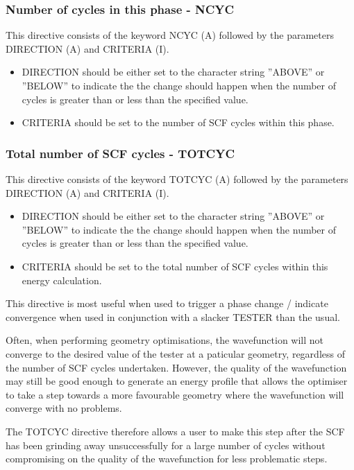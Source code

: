 \documentclass[11pt,fleqn]{article}
\begin{document}
\subsubsection[Number of cycles in this phase - NCYC]{Number of cycles in this phase - NCYC}
This directive consists of the keyword NCYC (A) followed
by the parameters DIRECTION (A) and CRITERIA (I).

\begin{itemize}
\item DIRECTION should be either set to the character string ''ABOVE'' or
  ''BELOW'' to indicate the the change should happen when the number
  of cycles is greater than or less than the specified value.
\item CRITERIA should be set to the number of SCF cycles within this phase.
\end{itemize}

\subsubsection[Total number of SCF cycles - TOTCYC]{Total number of SCF cycles - TOTCYC}
This directive consists of the keyword TOTCYC (A) followed
by the parameters DIRECTION (A) and CRITERIA (I).

\begin{itemize}
\item DIRECTION should be either set to the character string ''ABOVE'' or
  ''BELOW'' to indicate the the change should happen when the number
  of cycles is greater than or less than the specified value.
\item CRITERIA should be set to the total number of SCF cycles within
  this energy calculation.
\end{itemize}

This directive is most useful when used to trigger a phase change /
indicate convergence when used in conjunction with a slacker TESTER
than the usual.

Often, when performing geometry optimisations, the wavefunction will
not converge to the desired value of the tester at a paticular
geometry, regardless of the number of SCF cycles undertaken. However,
the quality of the wavefunction may still be good enough to generate
an energy profile that allows the optimiser to take a step towards a
more favourable geometry where the wavefunction will converge with no
problems.

The TOTCYC directive therefore allows a user to make this step after
the SCF has been grinding away unsuccessfully for a large number of
cycles without compromising on the quality of the wavefunction for
less problematic steps.
\end{document}
